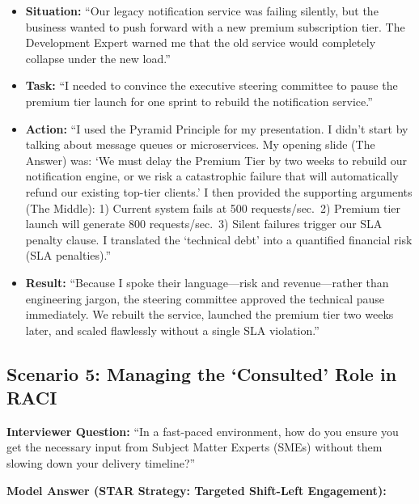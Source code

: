 \documentclass[
  11pt,
  openany,
  oneside]{book}
\providecommand{\tightlist}{%
  \setlength{\itemsep}{0pt}\setlength{\parskip}{0pt}}
\begin{document}
\begin{itemize}
\tightlist
\item
  \textbf{Situation:} ``Our legacy notification service was failing
  silently, but the business wanted to push forward with a new premium
  subscription tier. The Development Expert warned me that the old
  service would completely collapse under the new load.''
\item
  \textbf{Task:} ``I needed to convince the executive steering committee
  to pause the premium tier launch for one sprint to rebuild the
  notification service.''
\item
  \textbf{Action:} ``I used the Pyramid Principle for my presentation. I
  didn't start by talking about message queues or microservices. My
  opening slide (The Answer) was: `We must delay the Premium Tier by two
  weeks to rebuild our notification engine, or we risk a catastrophic
  failure that will automatically refund our existing top-tier clients.'
  I then provided the supporting arguments (The Middle): 1) Current
  system fails at 500 requests/sec.~2) Premium tier launch will generate
  800 requests/sec.~3) Silent failures trigger our SLA penalty clause. I
  translated the `technical debt' into a quantified financial risk (SLA
  penalties).''
\item
  \textbf{Result:} ``Because I spoke their language---risk and
  revenue---rather than engineering jargon, the steering committee
  approved the technical pause immediately. We rebuilt the service,
  launched the premium tier two weeks later, and scaled flawlessly
  without a single SLA violation.''
\end{itemize}

\subsection{Scenario 5: Managing the `Consulted' Role in
RACI}\label{scenario-5-managing-the-consulted-role-in-raci}

\textbf{Interviewer Question:} ``In a fast-paced environment, how do you
ensure you get the necessary input from Subject Matter Experts (SMEs)
without them slowing down your delivery timeline?''

\textbf{Model Answer (STAR Strategy: Targeted Shift-Left Engagement):}
\end{document}
